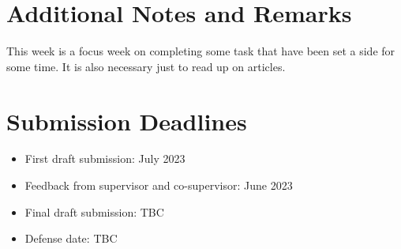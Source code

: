 \documentclass[12pt, a4paper]{article}
\begin{document}
\section*{Additional Notes and Remarks}
This week is a focus week on completing some task that have been set a side for some time. It is also necessary just to read up on articles. 


\section*{Submission Deadlines}
\begin{itemize}
\item First draft submission: July 2023
\item Feedback from supervisor and co-supervisor: June 2023
\item Final draft submission: TBC
\item Defense date: TBC
\end{itemize}
\end{document}
